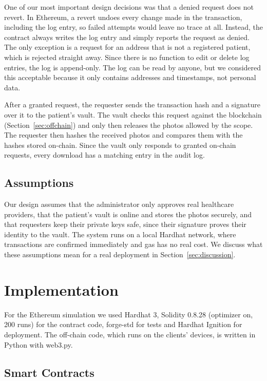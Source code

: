 \documentclass[10pt,a4paper]{article}
\begin{document}
One of our most important design decisions was that a denied request does not revert. In Ethereum, a revert undoes every change made in the transaction, including the log entry, so failed attempts would leave no trace at all. Instead, the contract always writes the log entry and simply reports the request as denied. The only exception is a request for an address that is not a registered patient, which is rejected straight away. Since there is no function to edit or delete log entries, the log is append-only. The log can be read by anyone, but we considered this acceptable because it only contains addresses and timestamps, not personal data.

After a granted request, the requester sends the transaction hash and a signature over it to the patient's vault. The vault checks this request against the blockchain (Section~\ref{sec:offchain}) and only then releases the photos allowed by the scope. The requester then hashes the received photos and compares them with the hashes stored on-chain. Since the vault only responds to granted on-chain requests, every download has a matching entry in the audit log.

\subsection{Assumptions}

Our design assumes that the administrator only approves real healthcare providers, that the patient's vault is online and stores the photos securely, and that requesters keep their private keys safe, since their signature proves their identity to the vault. The system runs on a local Hardhat network, where transactions are confirmed immediately and gas has no real cost. We discuss what these assumptions mean for a real deployment in Section~\ref{sec:discussion}.

\section{Implementation}
\label{sec:implementation}

For the Ethereum simulation we used Hardhat 3, Solidity 0.8.28 (optimizer on, 200 runs) for the contract code, forge-std for tests and Hardhat Ignition for deployment. The off-chain code, which runs on the clients' devices, is written in Python with web3.py.

\subsection{Smart Contracts}
\end{document}
